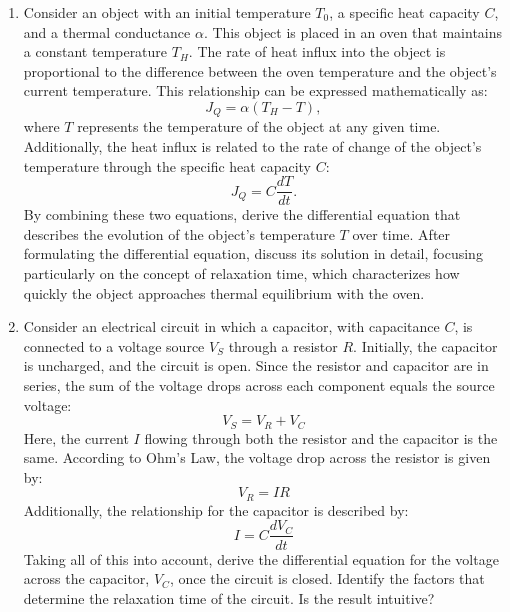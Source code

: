 \begin{enumerate}
    \item Consider an object with an initial temperature $T_0$, a specific heat capacity $C$, and a thermal conductance $\alpha$. This object is placed in an oven that maintains a constant temperature $T_H$. The rate of heat influx into the object is proportional to the difference between the oven temperature and the object's current temperature. This relationship can be expressed mathematically as:
    \begin{equation*}
        J_Q = \alpha (T_H - T), 
    \end{equation*}
    where $T$ represents the temperature of the object at any given time. Additionally, the heat influx is related to the rate of change of the object's temperature through the specific heat capacity $C$:
    \begin{equation*}
        J_Q = C \frac{dT}{dt}.
    \end{equation*}
    By combining these two equations, derive the differential equation that describes the evolution of the object's temperature $T$ over time. After formulating the differential equation, discuss its solution in detail, focusing particularly on the concept of relaxation time, which characterizes how quickly the object approaches thermal equilibrium with the oven.

    \item Consider an electrical circuit in which a capacitor, with capacitance $C$, is connected to a voltage source $V_S$ through a resistor $R$. Initially, the capacitor is uncharged, and the circuit is open. Since the resistor and capacitor are in series, the sum of the voltage drops across each component equals the source voltage:
    \begin{equation*}
        V_S = V_R + V_C
    \end{equation*}
    Here, the current $I$ flowing through both the resistor and the capacitor is the same. According to Ohm's Law, the voltage drop across the resistor is given by:
    \begin{equation*}
        V_R = I R
    \end{equation*}
    Additionally, the relationship for the capacitor is described by:    
    \begin{equation*}
        I = C \frac{d V_C}{dt}
    \end{equation*}    
    Taking all of this into account, derive the differential equation for the voltage across the capacitor, $V_C$, once the circuit is closed. Identify the factors that determine the relaxation time of the circuit. Is the result intuitive?


\end{enumerate}
